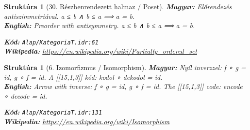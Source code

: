 \documentclass[11pt,a4paper,twocolumn]{article}
\newtheorem{struktura}[tetel]{Struktúra}
\begin{document}
\begin{struktura}[30. Részbenrendezett halmaz / Poset]

\textbf{Magyar:} Előrendezés antiszimmetriával. a ≤ b ∧ b ≤ a ⟹ a = b.\\

\textbf{English:} Preorder with antisymmetry. a ≤ b ∧ b ≤ a ⟹ a = b.\\

\begin{center}
\end{center}

\textbf{Kód:} \texttt{Alap/KategoriaT.idr:61}\\
\textbf{Wikipedia:} \url{https://en.wikipedia.org/wiki/Partially_ordered_set}

\end{struktura}

\vspace{0.5cm}

\begin{struktura}[6. Izomorfizmus / Isomorphism]

\textbf{Magyar:} Nyíl inverzzel: f ∘ g = id, g ∘ f = id. A [[15,1,3]] kód: kodol ∘ dekodol = id.\\

\textbf{English:} Arrow with inverse: f ∘ g = id, g ∘ f = id. The [[15,1,3]] code: encode ∘ decode = id.\\

\begin{center}
\end{center}

\textbf{Kód:} \texttt{Alap/KategoriaT.idr:131}\\
\textbf{Wikipedia:} \url{https://en.wikipedia.org/wiki/Isomorphism}

\end{struktura}

\vspace{0.5cm}
\end{document}
